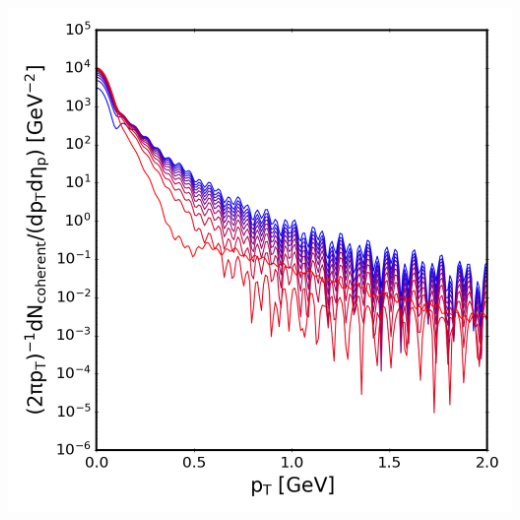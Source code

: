 {\begin{minipage}{\linewidth}
{\begin{minipage}{0.4\linewidth}
                \includegraphics[width=\linewidth]{code/C++/DCCspec/images/spectra_real_consteps_20240826_143151_m398_spec.png}        
            \end{minipage}
        }
        \label{fig:SpecRealConstEps_m398}
    \end{minipage}
}

